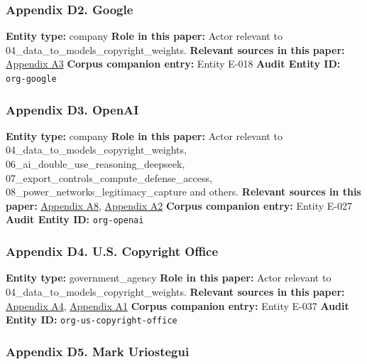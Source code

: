 \documentclass[
  american,
  11pt,
  letterpaper,
]{article}
\begin{document}
\subsubsection{Appendix D2. Google}\label{appendix-d2-google}

\textbf{Entity type:} company \textbf{Role in this paper:} Actor
relevant to 04\_data\_to\_models\_copyright\_weights. \textbf{Relevant
sources in this paper:}
\hyperref[appendix-a3-reddit-strikes-60m-deal-allowing-google-to-train-ai-models-on-its-posts-unveils-ipo-plans]{Appendix
A3} \textbf{Corpus companion entry:} Entity E-018 \textbf{Audit Entity
ID:} \texttt{org-google}

\subsubsection{Appendix D3. OpenAI}\label{appendix-d3-openai}

\textbf{Entity type:} company \textbf{Role in this paper:} Actor
relevant to 04\_data\_to\_models\_copyright\_weights,
06\_ai\_double\_use\_reasoning\_deepseek,
07\_export\_controls\_compute\_defense\_access,
08\_power\_networks\_legitimacy\_capture and others. \textbf{Relevant
sources in this paper:}
\hyperref[appendix-a8-the-new-york-times-company-v-microsoft-corporation-et-al-opinion-on-motions-to-dismiss]{Appendix
A8},
\hyperref[appendix-a2-language-models-are-unsupervised-multitask-learners]{Appendix
A2} \textbf{Corpus companion entry:} Entity E-027 \textbf{Audit Entity
ID:} \texttt{org-openai}

\subsubsection{Appendix D4. U.S. Copyright
Office}\label{appendix-d4-u-s-copyright-office}

\textbf{Entity type:} government\_agency \textbf{Role in this paper:}
Actor relevant to 04\_data\_to\_models\_copyright\_weights.
\textbf{Relevant sources in this paper:}
\hyperref[appendix-a4-copyright-and-artificial-intelligence-notice-of-inquiry]{Appendix
A4},
\hyperref[appendix-a1-copyright-and-artificial-intelligence-part-3-generative-ai-training-pre-publication-version]{Appendix
A1} \textbf{Corpus companion entry:} Entity E-037 \textbf{Audit Entity
ID:} \texttt{org-us-copyright-office}

\subsubsection{Appendix D5. Mark
Uriostegui}\label{appendix-d5-mark-uriostegui}
\end{document}
